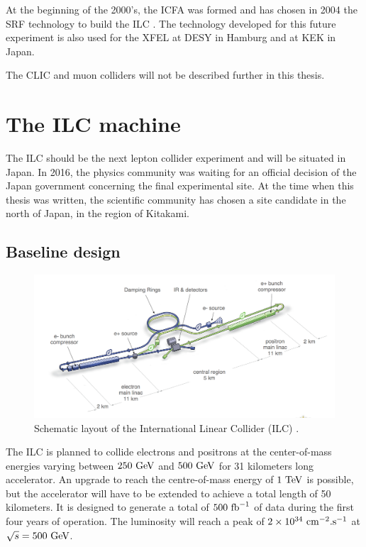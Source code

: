     At the beginning of the 2000's, the \gls{ICFA} was formed and has chosen in 2004 the \gls{SRF} technology \cite{ICFA2004} to build the \gls{ILC} \cite{ILC}.
    The technology developed for this future experiment is also used for the XFEL at \gls{DESY} in Hamburg and at KEK in Japan.
        
    The \gls{CLIC} and muon colliders will not be described further in this thesis.
     
  \section{The ILC machine}
  
    The \gls{ILC} should be the next lepton collider experiment and will be situated in Japan.
    In 2016, the physics community was waiting for an official decision of the Japan government concerning the final experimental site. 
    At the time when this thesis was written, the scientific community has chosen a site candidate in the north of Japan, in the region of Kitakami. 
    
    \subsection{Baseline design}

   \begin{figure}[!h]
      \centering
      \includegraphics[width = 16 cm]{Pictures/ILC/ILC_new.png}
      \caption{Schematic layout of the International Linear Collider (ILC) \cite{Behnke2013}.}
      \label{fig:ILC}
    \end{figure}


    The \gls{ILC} is planned to collide electrons and positrons at the center-of-mass energies varying between $250~\rm{GeV}$ and $500~\rm{GeV}$ for 31 kilometers long accelerator. 
    An upgrade to reach the centre-of-mass energy of $1~\rm{TeV}$ is possible, but the accelerator will have to be extended to achieve a total length of 50 kilometers.
    It is designed to generate a total of $500~\rm{fb}^{-1}$ of data during the first four years of operation. 
    The luminosity will reach a peak of $2 \times 10^{34}~\rm{cm}^{-2}\rm{.s}^{-1}$ at $\sqrt s = 500~\rm{GeV}$.

